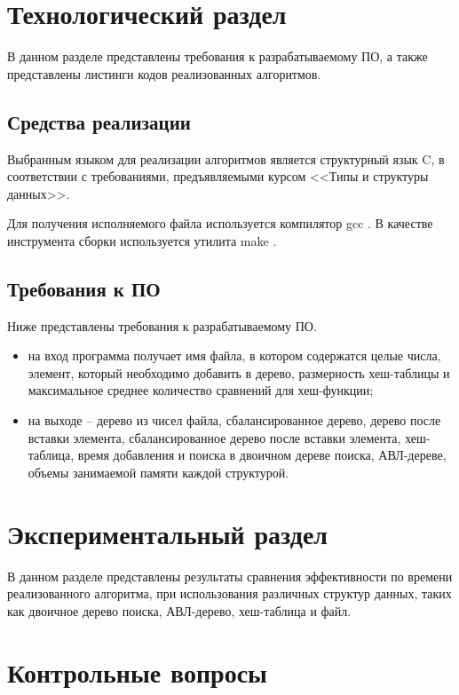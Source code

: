 \chapter{Технологический раздел}

В данном разделе представлены требования к разрабатываемому ПО, а также представлены листинги кодов реализованных алгоритмов.

\section{Средства реализации}

Выбранным языком для реализации алгоритмов является структурный язык C, в соответствии с требованиями, предъявляемыми курсом <<Типы и структуры данных>>. 

Для получения исполняемого файла используется компилятор gcc \cite{gcc}. В качестве инструмента сборки используется утилита make \cite{make}.

\section{Требования к ПО}

Ниже представлены требования к разрабатываемому ПО.

\begin{itemize}[$\bullet$]
    \item на вход программа получает имя файла, в котором содержатся целые числа, элемент, который необходимо добавить в дерево, размерность хеш-таблицы и максимальное среднее количество сравнений для хеш-функции;
    \item на выходе -- дерево из чисел файла, сбалансированное дерево, дерево после вставки элемента, сбалансированное дерево после вставки элемента, хеш-таблица, время добавления и поиска в двоичном дереве поиска, АВЛ-дереве, объемы занимаемой памяти каждой структурой.
\end{itemize}

\chapter{Экспериментальный раздел}

В данном разделе представлены результаты сравнения эффективности по времени реализованного алгоритма, при использования различных структур данных, таких как двоичное дерево поиска, АВЛ-дерево, хеш-таблица и файл.


\chapter{Контрольные вопросы}


